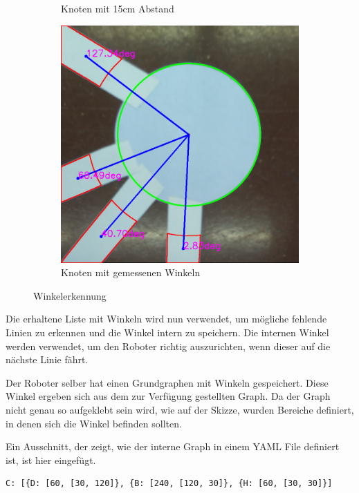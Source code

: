 \begin{figure}[H]
\begin{subfigure}{0.45\textwidth}
\caption{Knoten mit 15cm Abstand}
\label{fig:node-15cm-before}
\end{subfigure}
\begin{subfigure}{0.45\textwidth}
\includegraphics[width=0.95\linewidth]{assets/informatik-prototyp/opencv/angle_detection/node_with_edge_angles_annotated.png} 
\caption{Knoten mit gemessenen Winkeln}
\label{fig:node-angles}
\end{subfigure}

\caption{Winkelerkennung}
\label{fig:angle-recognition}
\end{figure}

Die erhaltene Liste mit Winkeln wird nun verwendet, um mögliche fehlende Linien zu erkennen und die Winkel intern zu speichern. Die internen Winkel werden verwendet, um den Roboter richtig auszurichten, wenn dieser auf die nächste Linie fährt.

Der Roboter selber hat einen Grundgraphen mit Winkeln gespeichert. Diese Winkel ergeben sich aus dem zur Verfügung gestellten Graph.
Da der Graph nicht genau so aufgeklebt sein wird, wie auf der Skizze, wurden Bereiche definiert, in denen sich die Winkel befinden sollten.

Ein Ausschnitt, der zeigt, wie der interne Graph in einem YAML File definiert ist, ist hier eingefügt.

\begin{verbatim}
C: [{D: [60, [30, 120]}, {B: [240, [120, 30]}, {H: [60, [30, 30]}]
\end{verbatim}

